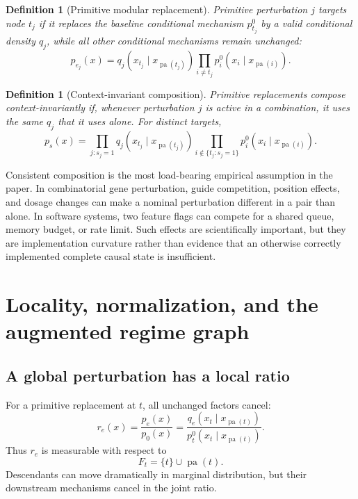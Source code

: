 \documentclass[11pt]{article}
\newtheorem{definition}[theorem]{Definition}
\newcommand{\pa}{\operatorname{pa}}
\begin{document}
\begin{definition}[Primitive modular replacement]
Primitive perturbation \(j\) targets node \(t_j\) if it replaces the baseline conditional mechanism \(p_{t_j}^0\) by a valid conditional density \(q_j\), while all other conditional mechanisms remain unchanged:
\begin{equation}
p_{e_j}(x)=q_j(x_{t_j}\mid x_{\pa(t_j)})
\prod_{i\ne t_j}p_i^0(x_i\mid x_{\pa(i)}).
\end{equation}
\end{definition}

\begin{definition}[Context-invariant composition]
Primitive replacements compose context-invariantly if, whenever perturbation \(j\) is active in a combination, it uses the same \(q_j\) that it uses alone.  For distinct targets,
\begin{equation}
p_s(x)=
\prod_{j:s_j=1}q_j(x_{t_j}\mid x_{\pa(t_j)})
\prod_{i\notin\{t_j:s_j=1\}}p_i^0(x_i\mid x_{\pa(i)}).
\label{eq:modular-combination}
\end{equation}
\end{definition}

Consistent composition is the most load-bearing empirical assumption in the paper.  In combinatorial gene perturbation, guide competition, position effects, and dosage changes can make a nominal perturbation different in a pair than alone.  In software systems, two feature flags can compete for a shared queue, memory budget, or rate limit.  Such effects are scientifically important, but they are implementation curvature rather than evidence that an otherwise correctly implemented complete causal state is insufficient.

\section{Locality, normalization, and the augmented regime graph}

\subsection{A global perturbation has a local ratio}

For a primitive replacement at \(t\), all unchanged factors cancel:
\begin{equation}
r_e(x)=\frac{p_e(x)}{p_0(x)}
=\frac{q_e(x_t\mid x_{\pa(t)})}{p_t^0(x_t\mid x_{\pa(t)})}.
\label{eq:local-ratio}
\end{equation}
Thus \(r_e\) is measurable with respect to
\begin{equation}
F_t=\{t\}\cup\pa(t).
\end{equation}
Descendants can move dramatically in marginal distribution, but their downstream mechanisms cancel in the joint ratio.
\end{document}
